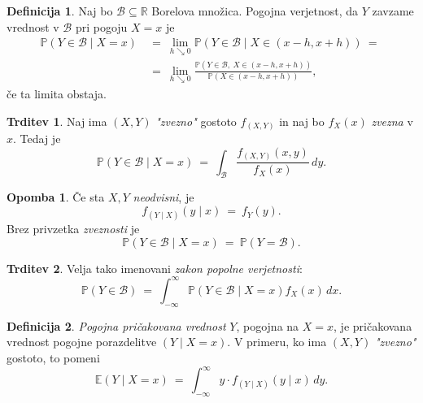 \documentclass[11pt]{article}
\newcommand{\p}{\mathbb{P}}
\newcommand{\E}{\mathbb{E}}
\newcommand{\R}{\mathbb{R}}
\newcommand{\1}{\mathbbm{1}}
\newcommand{\B}{\mathcal{B}}
\theoremstyle{definition}
\newtheorem{definicija}{Definicija}[section]
\theoremstyle{definition}
\newtheorem{trditev}{Trditev}[section]
\theoremstyle{definition}
\newtheorem*{opomba}{Opomba}
\begin{document}
\begin{definicija}

Naj bo $\B \subseteq \R$ Borelova množica. Pogojna verjetnost, da $Y$ zavzame vrednost v $\B$ pri pogoju $X=x$ je
\begin{align*}
\p(Y \in \B \mid X=x) ~&=~ \lim_{h \searrow 0} \p(Y \in \B \mid X \in (x-h, x+h)) ~=~ \\
~&=~ \lim_{h \searrow 0} \frac{\p(Y \in \B,~ X \in (x-h, x+h))}{\p(X \in (x-h, x+h))},
\end{align*}
če ta limita obstaja.

\end{definicija}
\vspace{0.5cm}

\begin{trditev}

Naj ima $(X, Y)$ \textit{"zvezno"} gostoto $f_{(X, Y)}$ in naj bo $f_X(x)$ \textit{zvezna} v $x$. Tedaj je
$$\p(Y \in \B \mid X=x) ~=~ \int_\B \frac{f_{(X, Y)}(x, y)}{f_X(x)}\,dy.$$

\end{trditev}
\vspace{0.5cm}

\begin{opomba}

Če sta $X, Y$ \textit{neodvisni}, je 
$$f_{(Y \mid X)}(y \mid x) ~=~ f_Y(y).$$
Brez privzetka \textit{zveznosti} je 
$$\p(Y \in \B \mid X=x) ~=~ \p(Y = \B).$$

\end{opomba}
\vspace{0.5cm}

\begin{trditev}

Velja tako imenovani \textit{zakon popolne verjetnosti}:
$$\p(Y \in \B) ~=~ \int_{-\infty}^\infty \p(Y \in \B \mid X=x)f_X(x)\,dx.$$

\end{trditev}
\vspace{0.5cm}

\begin{definicija}

\textit{Pogojna pričakovana vrednost} $Y$, pogojna na $X=x$, je pričakovana vrednost pogojne porazdelitve $(Y \mid X=x)$. V primeru, ko ima $(X, Y)$ \textit{"zvezno"} gostoto, to pomeni
$$\E(Y \mid X=x) ~=~ \int_{-\infty}^\infty y \cdot f_{(Y \mid X)}(y \mid x)\,dy.$$

\end{definicija}
\vspace{0.5cm}
\end{document}
